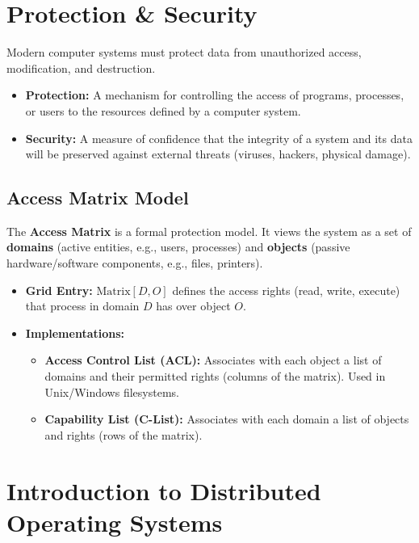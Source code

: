 \documentclass[12pt,a4paper]{article}
\begin{document}
\section{Protection \& Security}

Modern computer systems must protect data from unauthorized access, modification, and destruction.
\begin{itemize}[leftmargin=*, itemsep=3pt]
  \item \textbf{Protection:} A mechanism for controlling the access of programs, processes, or users to the resources defined by a computer system.
  \item \textbf{Security:} A measure of confidence that the integrity of a system and its data will be preserved against external threats (viruses, hackers, physical damage).
\end{itemize}

\subsection{Access Matrix Model}
The \textbf{Access Matrix} is a formal protection model. It views the system as a set of \textbf{domains} (active entities, e.g., users, processes) and \textbf{objects} (passive hardware/software components, e.g., files, printers).
\begin{itemize}[leftmargin=*, itemsep=3pt]
  \item \textbf{Grid Entry:} $\text{Matrix}[D, O]$ defines the access rights (read, write, execute) that process in domain $D$ has over object $O$.
  \item \textbf{Implementations:}
  \begin{itemize}[leftmargin=*, itemsep=2.5pt, topsep=0pt]
    \item \textbf{Access Control List (ACL):} Associates with each object a list of domains and their permitted rights (columns of the matrix). Used in Unix/Windows filesystems.
    \item \textbf{Capability List (C-List):} Associates with each domain a list of objects and rights (rows of the matrix).
    \end{itemize}
  \end{itemize}

\section{Introduction to Distributed Operating Systems}
\end{document}
